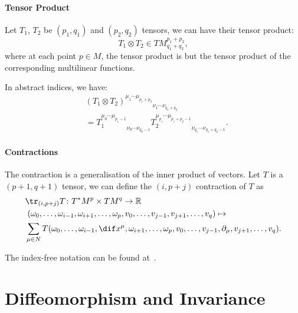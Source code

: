 \documentclass[openany, oneside, a5paper]{book}
\begin{document}
\paragraph{Tensor Product}
Let $T_1$, $T_2$ be $(p_1, q_1)$ and $(p_2, q_2)$ tensors, we can have their tensor product:
\begin{equation}
    T_1 \otimes T_2 \in TM^{p_1 + p_2}_{q_1 + q_2},
\end{equation}
where at each point $p \in M$, the tensor product is but the tensor product of the corresponding multilinear functions.

In abstract indices, we have:
\begin{align}
    &{(T_1 \otimes T_2)^{\mu_1 \cdots \mu_{p_1 + p_2}}}_{\nu_1 \cdots \nu_{q_1 + q_2}}
    \\
    &= {T_1^{\mu_0 \cdots \mu_{p_1 - 1}}}_{\nu_0 \cdots \nu_{q_0 - 1}} 
    {T_2^{\mu_{p_1} \cdots \mu_{p_1 + p_2 - 1}}}_{\nu_{q_1} \cdots \nu_{q_1 + q_2 - 1}}.
\end{align}

\paragraph{Contractions}

The contraction is a generalisation of the inner product of vectors.
Let $T$ is a $(p + 1, q + 1)$ tensor, we can define the $(i, p + j)$ contraction of $T$ as
{\small
\begin{align}
    &\tr_{(i, p+j)} T \colon  T^*M^p \times TM^q \to \mathbb{R}
    \\
    &\; (\omega_0, \ldots, \omega_{i-1}, \omega_{i+1}, \ldots, \omega_p,  v_0, \ldots, v_{j-1},  v_{j+1}, \ldots, v_q) \mapsto 
    \\
    &
    \sum_{\mu \in N} T(\omega_0, \ldots, \omega_{i-1}, \dif x^\mu,\omega_{i+1}, \ldots, \omega_p,  v_0, \ldots, v_{j-1},  \partial_\mu,v_{j+1}, \ldots, v_q).
\end{align}
}

The index-free notation can be found at~\cite{Yuri-Vyatkin-StackExchange}.

\section{Diffeomorphism and Invariance}
\end{document}

